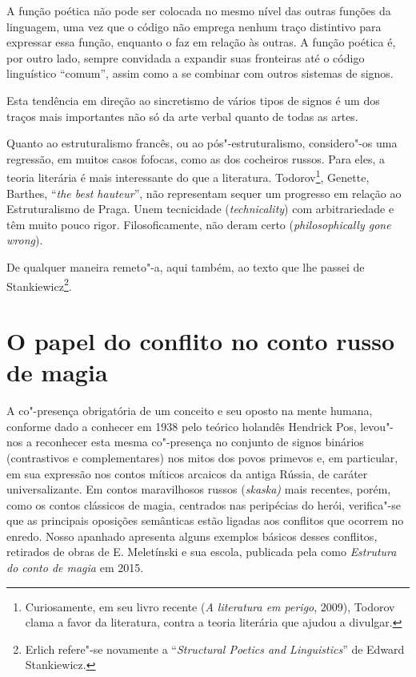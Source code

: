A função poética não pode ser colocada no mesmo nível das outras funções
da linguagem, uma vez que o código não emprega nenhum traço distintivo
para expressar essa função, enquanto o faz em relação às outras. A
função poética é, por outro lado, sempre convidada a expandir suas
fronteiras até o código linguístico ``comum'', assim como a se combinar
com outros sistemas de signos.

Esta tendência em direção ao sincretismo de vários tipos de signos é um
dos traços mais importantes não só da arte verbal quanto de todas as
artes.

Quanto ao estruturalismo francês, ou ao pós"-estruturalismo, considero"-os
uma regressão, em muitos casos fofocas, como as dos cocheiros russos.
Para eles, a teoria literária é mais interessante do que a literatura.
Todorov\footnote{Curiosamente, em seu livro recente (\emph{A literatura
  em perigo}, 2009), Todorov clama a favor da literatura, contra a
  teoria literária que ajudou a divulgar.}, Genette, Barthes, ``\emph{the best hauteur}'', não representam
sequer um progresso em relação ao Estruturalismo de Praga. Unem
tecnicidade (\emph{technicality}) com arbitrariedade e têm muito pouco
rigor. Filosoficamente, não deram certo (\emph{philosophically gone
wrong}).

De qualquer maneira remeto"-a, aqui também, ao texto que lhe passei de
Stankiewicz\footnote{Erlich refere"-se novamente a ``\emph{Structural
  Poetics and Linguistics}'' de Edward Stankiewicz.}.

\chapter{O papel do conflito no conto russo de magia}


A co"-presença obrigatória de um conceito e seu oposto na mente humana,
conforme dado a conhecer em 1938 pelo teórico holandês Hendrick Pos,
levou"-nos a reconhecer esta mesma co"-presença no conjunto de signos
binários (contrastivos e complementares) nos mitos dos povos primevos e, em particular, em sua expressão nos contos míticos arcaicos da antiga
Rússia, de caráter universalizante. Em contos maravilhosos russos
(\emph{skaska)} mais recentes, porém, como os contos clássicos de
magia, centrados nas peripécias do herói, verifica"-se que as principais
oposições semânticas estão ligadas aos conflitos que ocorrem no enredo.
Nosso apanhado apresenta alguns exemplos básicos desses conflitos,
retirados de obras de E. Meletínski e sua escola, publicada pela 
como \emph{Estrutura do conto de magia} em 2015.

